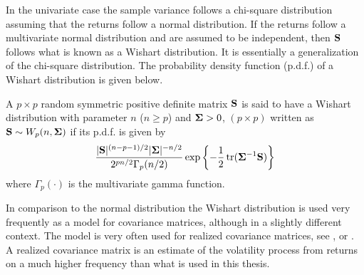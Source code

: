 \documentclass[12pt, oneside]{book}\usepackage{knitr}
\begin{document}
{In the univariate case the sample variance follows a chi-square distribution assuming that the returns follow a normal distribution. 
If the returns follow a multivariate normal distribution and are assumed to be independent, then $\mathbf{S}$ follows what is known as a Wishart distribution. 
It is essentially a generalization of the chi-square distribution. 
The probability density function (p.d.f.) of a Wishart distribution is given below.
\begin{definition}\label{def:wishart}
	A $p\times p$ random symmetric positive definite matrix $\mathbf{S}$ is said to have a Wishart distribution with parameter $n$ ($n\geq p$) and $\mathbf{\Sigma} > 0$, $(p \times p)$ written as $\mathbf{S} \sim W_p(n, \mathbf{\Sigma})$ if its p.d.f. is given by
	\begin{equation}\label{eqn:wishart_density}
  	\frac{|\mathbf{S}|^{(n-p-1)/2} |\mathbf{\Sigma}|^{- n/2} }{2^{pn/2} \Gamma_p (n/2) } \exp\left\{-\frac{1}{2} \operatorname{tr}(\mathbf{\Sigma}^{-1}\mathbf{S})  \right\}
	\end{equation}
	where $ \Gamma_p (\cdot) $ is the multivariate gamma function.
\end{definition}
In comparison to the normal distribution the Wishart distribution is used very frequently as a model for covariance matrices, although in a slightly different context.
The model is very often used for realized covariance matrices, see \citet{barndorff2004econometric}, \citet{golosnoy2019exponential} or \citet{alfelt2021modeling}.
A realized covariance matrix is an estimate of the volatility process from returns on a much higher frequency than what is used in this thesis.

}
\end{document}
